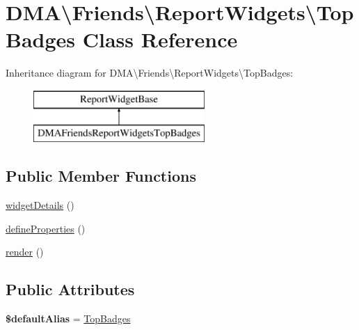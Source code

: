 \hypertarget{classDMA_1_1Friends_1_1ReportWidgets_1_1TopBadges}{}\section{D\+M\+A\textbackslash{}Friends\textbackslash{}Report\+Widgets\textbackslash{}Top\+Badges Class Reference}
\label{classDMA_1_1Friends_1_1ReportWidgets_1_1TopBadges}
Inheritance diagram for D\+M\+A\textbackslash{}Friends\textbackslash{}Report\+Widgets\textbackslash{}Top\+Badges\+:\begin{figure}[H]
\begin{center}
\leavevmode
\includegraphics[height=2.000000cm]{d4/d08/classDMA_1_1Friends_1_1ReportWidgets_1_1TopBadges}
\end{center}
\end{figure}
\subsection*{Public Member Functions}
\begin{DoxyCompactItemize}
\item 
\hyperlink{classDMA_1_1Friends_1_1ReportWidgets_1_1TopBadges_a656b065ab496d17f53bb3d6f72829839}{widget\+Details} ()
\item 
\hyperlink{classDMA_1_1Friends_1_1ReportWidgets_1_1TopBadges_ada143ab79b674f6a5d78f01c4e0d23d2}{define\+Properties} ()
\item 
\hyperlink{classDMA_1_1Friends_1_1ReportWidgets_1_1TopBadges_a5f2ad462247e773176db74bf211a9d7d}{render} ()
\end{DoxyCompactItemize}
\subsection*{Public Attributes}
\begin{DoxyCompactItemize}
\item 
\hypertarget{classDMA_1_1Friends_1_1ReportWidgets_1_1TopBadges_a3cb9c481cd865661bc3c58fd65f144fe}{}{\bfseries \$default\+Alias} = \textquotesingle{}\hyperlink{classDMA_1_1Friends_1_1ReportWidgets_1_1TopBadges}{Top\+Badges}\textquotesingle{}\label{classDMA_1_1Friends_1_1ReportWidgets_1_1TopBadges_a3cb9c481cd865661bc3c58fd65f144fe}

\end{DoxyCompactItemize}


